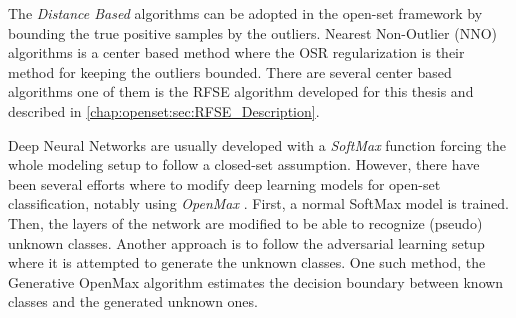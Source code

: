 The \textit{Distance Based} algorithms can be adopted in the open-set framework by bounding the true positive samples by the outliers. Nearest Non-Outlier (NNO) algorithms is a center based method where the OSR regularization is their method for keeping the outliers bounded. There are several center based algorithms one of them is the RFSE algorithm developed for this thesis and described in \ref{chap:openset:sec:RFSE_Description}. 




Deep Neural Networks are usually developed with a \textit{SoftMax} function forcing the whole modeling setup to follow a closed-set assumption. However, there have been several efforts where to modify deep learning models for open-set classification, notably using \textit{OpenMax} \parencite{bendale2016towards,cardoso2017weightless}. First, a normal SoftMax model is trained. Then, the layers of the network are modified to be able to recognize (pseudo) unknown classes. Another approach is to follow the adversarial learning setup where it is attempted to generate the unknown classes. One such method, the Generative OpenMax algorithm \parencite{ge2017generative} estimates the decision boundary between known classes and the generated unknown ones.


